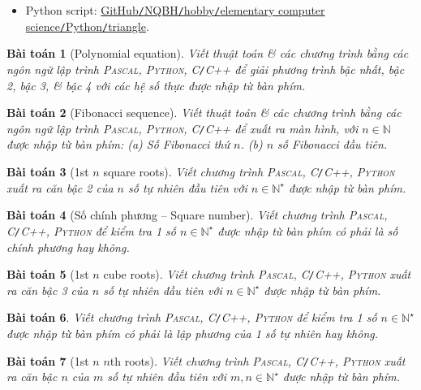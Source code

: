 \documentclass{article}
\newtheorem{baitoan}{Bài toán}
\begin{document}
\begin{itemize}
	\item Python script: \href{https://github.com/NQBH/hobby/blob/master/elementary_computer_science/Python/triangle.py}{GitHub\texttt{/}NQBH\texttt{/}hobby\texttt{/}elementary computer science\texttt{/}Python\texttt{/}triangle}.
\end{itemize}

\begin{baitoan}[Polynomial equation]
	Viết thuật toán \& các chương trình bằng các ngôn ngữ lập trình \textsc{Pascal, Python, C\texttt{/}C++} để giải phương trình bậc nhất, bậc 2, bậc 3, \& bậc 4 với các hệ số thực được nhập từ bàn phím.
\end{baitoan}

\begin{baitoan}[Fibonacci sequence]
	Viết thuật toán \& các chương trình bằng các ngôn ngữ lập trình \textsc{Pascal, Python, C\texttt{/}C++} để xuất ra màn hình, với $n\in\mathbb{N}$ được nhập từ bàn phím: (a) Số Fibonacci thứ $n$. (b) $n$ số Fibonacci đầu tiên.
\end{baitoan}

\begin{baitoan}[1st $n$ square roots]
	Viết chương trình \textsc{Pascal, C\texttt{/}C++, Python} xuất ra căn bậc 2 của $n$ số tự nhiên đầu tiên với $n\in\mathbb{N}^\star$ được nhập từ bàn phím.
\end{baitoan}

\begin{baitoan}[Số chính phương -- Square number]
	Viết chương trình \textsc{Pascal, C\texttt{/}C++, Python} để kiểm tra 1 số $n\in\mathbb{N}^\star$ được nhập từ bàn phím có phải là số chính phương hay không.
\end{baitoan}

\begin{baitoan}[1st $n$ cube roots]
	Viết chương trình \textsc{Pascal, C\texttt{/}C++, Python} xuất ra căn bậc 3 của $n$ số tự nhiên đầu tiên với $n\in\mathbb{N}^\star$ được nhập từ bàn phím.
\end{baitoan}

\begin{baitoan}
	Viết chương trình \textsc{Pascal, C\texttt{/}C++, Python} để kiểm tra 1 số $n\in\mathbb{N}^\star$ được nhập từ bàn phím có phải là lập phương của 1 số tự nhiên hay không.
\end{baitoan}

\begin{baitoan}[1st $n$ $n$th roots]
	Viết chương trình \textsc{Pascal, C\texttt{/}C++, Python} xuất ra căn bậc $n$ của $m$ số tự nhiên đầu tiên với $m,n\in\mathbb{N}^\star$ được nhập từ bàn phím.
\end{baitoan}
\end{document}
